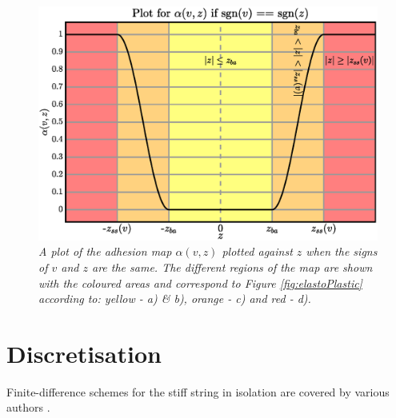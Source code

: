 \documentclass[twoside,a4paper,dvipsnames]{article}
\begin{document}
\begin{figure}[ht]
\centerline{\includegraphics[width=1.0\columnwidth]{drawAlpha.eps}}
\caption{\label{fig:alphaPlot}{\it A plot of the adhesion map $\alpha(v,z)$ plotted against $z$ when the signs of $v$ and $z$ are the same. The different regions of the map are shown with the coloured areas and correspond to Figure \ref{fig:elastoPlastic} according to: yellow - a) \& b), orange - c) and red - d).}}
\end{figure}

\section{Discretisation}\label{sec:discretisation}
Finite-difference schemes for the stiff string in isolation are covered by various authors \cite{Chaigne, Bilbao2009}. 
\end{document}
